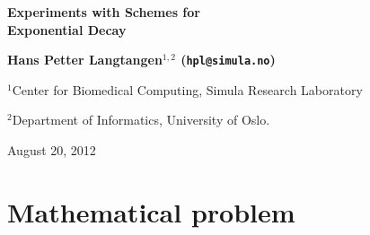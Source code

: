 \documentclass[twoside]{article}
\begin{document}






\begin{center}
{\LARGE\bf Experiments with Schemes for \\ [1.5mm] Exponential Decay}
\end{center}





\begin{center}
{\bf Hans Petter Langtangen${}^{1, 2}$ (\texttt{hpl@simula.no})} \\ [0mm]
\end{center}

\begin{center}
\centerline{{\small ${}^1$Center for Biomedical Computing, Simula Research Laboratory}}
\centerline{{\small ${}^2$Department of Informatics, University of Oslo.}}
\end{center}





\begin{center}
August 20, 2012
\end{center}

\vspace{1cm}



\begin{abstract}
This report investigates the accuracy of three finite difference
schemes for the ordinary differential equation $u'=-au$ with the
aid of numerical experiments. Numerical artifacts are in particular
demonstrated.



\end{abstract}

\tableofcontents





\section{Mathematical problem}
\end{document}
